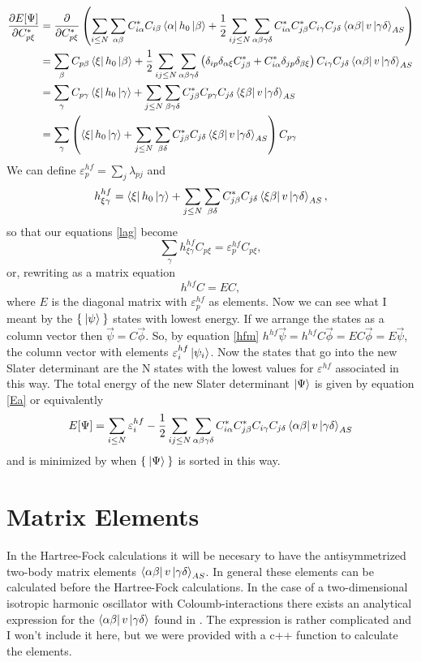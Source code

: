 \documentclass[a4paper,english,12pt]{article}
\newcommand{\p}{\partial}
\newcommand{\pddt}[2]{\frac{\p #1}{\p #2}}
\newcommand{\be}{\begin{equation}}
\newcommand{\ee}{\end{equation}}
\renewcommand{\epsilon}{\varepsilon}
\begin{document}
\begin{align*}
\pddt{E[\Psi]}{C^*_{p\xi}} &= \pddt{}{C^*_{p\xi}}\left( \sum_{i\leq N}\sum_{\alpha\beta}C_{i\alpha}^*C_{i\beta}\bra{\alpha}h_0\ket{\beta} +
\frac{1}{2}\sum_{ij\leq N}\sum_{\alpha\beta\gamma\delta}C_{i\alpha}^*C_{j\beta}^*C_{i\gamma}C_{j\delta}\bra{\alpha\beta}v\ket{\gamma\delta}_{AS}\right)\\
&= \sum_{\beta}C_{p\beta}\bra{\xi}h_0\ket{\beta} +
\frac{1}{2}\sum_{ij\leq N}\sum_{\alpha\beta\gamma\delta}\left(\delta_{ip}\delta_{\alpha\xi}C_{j\beta}^*+
C_{i\alpha}^*\delta_{jp}\delta_{\beta\xi}\right)C_{i\gamma}C_{j\delta}\bra{\alpha\beta}v\ket{\gamma\delta}_{AS}\\
&=\sum_{\gamma}C_{p\gamma}\bra{\xi}h_0\ket{\gamma} +
\sum_{j\leq N}\sum_{\beta\gamma\delta}C_{j\beta}^*C_{p\gamma}C_{j\delta}\bra{\xi\beta}v\ket{\gamma\delta}_{AS}\\
&=\sum_\gamma\left(\bra{\xi}h_0\ket{\gamma}+\sum_{j\leq N}\sum_{\beta\delta}C_{j\beta}^*C_{j\delta}\bra{\xi\beta}v\ket{\gamma\delta}_{AS}\right)C_{p\gamma}
\end{align*}
We can define \( \epsilon_p^{hf}=\sum_j\lambda_{pj} \) and
\be\label{hfd}
 h_{\xi\gamma}^{hf}=\bra{\xi}h_0\ket{\gamma}+\sum_{j\leq N}\sum_{\beta\delta}C_{j\beta}^*C_{j\delta}\bra{\xi\beta}v\ket{\gamma\delta}_{AS},
\ee
so that our equations \ref{lag} become
\be\label{hfi}
\sum_\gamma h_{\xi\gamma}^{hf}C_{p\xi} = \epsilon^{hf}_{p}C_{p\xi},
\ee
or, rewriting as a matrix equation
\be\label{hfm}
h^{hf}C = E C,
\ee
where $E$ is the diagonal matrix with $\epsilon^{hf}_p$ as elements.
Now we can see what I meant by the $\Set{\Ket{\psi}}$ states with lowest energy. If we arrange the states as a column vector then
\(\vec{\psi} = C\vec{\phi}\). So, by equation \ref{hfm} \(h^{hf}\vec{\psi} = h^{hf}C\vec{\phi} = EC\vec{\phi} = E\vec{\psi}\), the column vector with elements
\(\epsilon^{hf}_i\ket{\psi_i}\). Now the states that go into the new Slater determinant are the N states with the lowest values for $\epsilon^{hf}$ associated in this way.
The total energy of the new Slater determinant \(\Ket{\Psi}\) is given by equation \ref{Ea} or equivalently
\be\label{Ep}
E[\Psi] = \sum_{i\leq N}\epsilon^{hf}_i -
\frac{1}{2}\sum_{ij\leq N}\sum_{\alpha\beta\gamma\delta}C_{i\alpha}^*C_{j\beta}^*C_{i\gamma}C_{j\delta}\bra{\alpha\beta}v\ket{\gamma\delta}_{AS}
\ee
and is minimized by when $\Set{\Ket{\Psi}}$ is sorted in this way.

\section{Matrix Elements}
In the Hartree-Fock calculations it will be necesary to have the antisymmetrized two-body matrix elements $\bra{\alpha\beta}v\ket{\gamma\delta}_{AS}$.
In general these elements can be calculated before the Hartree-Fock calculations. In the case of a two-dimensional isotropic harmonic oscillator
with Coloumb-interactions there exists an analytical expression for the $\bra{\alpha\beta}v\ket{\gamma\delta}$ found in \cite{analytho}. The expression is rather complicated and I won't
include it here, but we were provided with a c++ function to calculate the elements.
\end{document}
